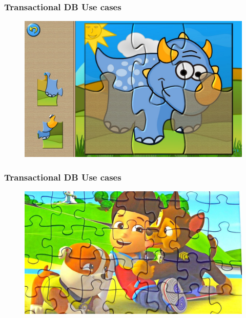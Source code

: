 \begin{frame}
\frametitle{Transactional DB Use cases}
\begin{figure}[ht]
	
	\centering
	\includegraphics[width=\linewidth]{./Figures/chapter-01/baby-01.jpg}
\end{figure}
\end{frame}


\begin{frame}
\frametitle{Transactional DB Use cases}
\begin{figure}[ht]

\centering
\includegraphics[width=\linewidth]{./Figures/chapter-01/baby-02.jpg}
\end{figure}
\end{frame}


